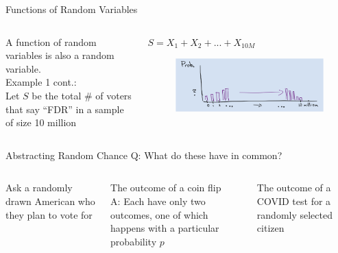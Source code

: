 \documentclass[aspectratio=169]{../latex_main/tntbeamer}  %
\begin{document}
	\begin{frame}[c]{Functions of Random Variables}
	    \begin{columns}
	        \begin{column}{.4\textwidth}
	            A function of random variables is also a random variable.\\
	            \bigskip
	            Example 1 cont.:\\
                Let $S$ be the total # of voters that say “FDR” in a sample of size 10 million\\
	        \end{column}
	        
	        \begin{column}{.4\textwidth}
	           $S=X_1 + X_2 + ... + X_{10M}$
	           \begin{figure}
	               \centering
	               \includegraphics[scale=.5]{Bild16}
	           \end{figure}
	        \end{column}
	    \end{columns}
	\end{frame}
	
	
	
	\begin{frame}[c]{Abstracting Random Chance}
	    Q: What do these have in common?\\
	    \bigskip
	    \begin{columns}
	        \begin{column}{.3\textwidth}
	            Ask a randomly drawn American who they plan to vote for
	        \end{column}
	        
	        \begin{column}{.3\textwidth}
	          The outcome of a coin flip\\
	          \bigskip
	          A: Each have only two outcomes, one of which happens with a particular probability $p$

	        \end{column}
	        
	        \begin{column}{.3\textwidth}
	          The outcome of a COVID test for a randomly selected citizen 

	        \end{column}
	    \end{columns}
	\end{frame}
	
\end{document}

